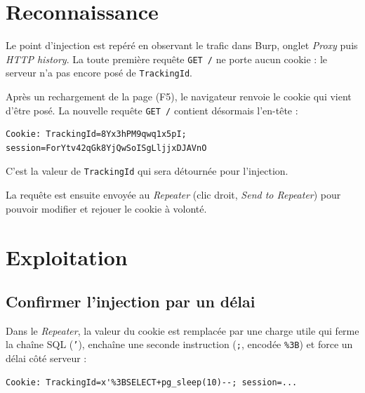 \documentclass[11pt,a4paper]{article}
\begin{document}

\section{Reconnaissance}
Le point d'injection est repéré en observant le trafic dans Burp, onglet
\emph{Proxy} puis \emph{HTTP history}. La toute première requête \texttt{GET /}
ne porte aucun cookie : le serveur n'a pas encore posé de \texttt{TrackingId}.


Après un rechargement de la page (F5), le navigateur renvoie le cookie qui
vient d'être posé. La nouvelle requête \texttt{GET /} contient désormais
l'en-tête :

\begin{lstlisting}
Cookie: TrackingId=8Yx3hPM9qwq1x5pI; session=ForYtv42qGk8YjQwSoISgLljjxDJAVnO
\end{lstlisting}

C'est la valeur de \texttt{TrackingId} qui sera détournée pour l'injection.


La requête est ensuite envoyée au \emph{Repeater} (clic droit, \emph{Send to
Repeater}) pour pouvoir modifier et rejouer le cookie à volonté.

\section{Exploitation}

\subsection{Confirmer l'injection par un délai}
Dans le \emph{Repeater}, la valeur du cookie est remplacée par une charge
utile qui ferme la chaîne SQL (\texttt{'}), enchaîne une seconde instruction
(\texttt{;}, encodée \texttt{\%3B}) et force un délai côté serveur :

\begin{lstlisting}
Cookie: TrackingId=x'%3BSELECT+pg_sleep(10)--; session=...
\end{lstlisting}
\end{document}

